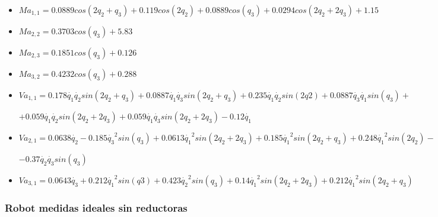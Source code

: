 \begin{itemize}

	\item $ Ma_{1,1}=0.0889cos(2q_{2} + q_{3}) + 0.119cos(2q_{2}) + 0.0889cos(q_{3}) + 0.0294cos(2q_{2} + 2q_{3}) + 1.15$ \\ \vspace{0.2cm}

	\item $ Ma_{2,2}=0.3703cos(q_{3}) + 5.83$ \\ \vspace{0.2cm}

	\item $ Ma_{2,3}=0.1851cos(q_{3}) + 0.126  $ \\ \vspace{0.2cm}

	\item $ Ma_{3,2}=0.4232cos(q_{3}) + 0.288  $ \\ \vspace{0.2cm}

	\item $ Va_{1,1}=0.178\dot{q_1}\dot{q_2}sin(2q_2 + q_3) + 0.0887\dot{q_1}\dot{q_3}sin(2q_2 + q_3) + 0.235\dot{q_1}\dot{q_2}sin(2q2) + 0.0887\dot{q_3}\dot{q_1}sin(q_3) + $ \\ \vspace{0.1cm}

	$+0.059\dot{q_1}\dot{q_2}sin(2q_2 + 2q_3) + 0.059\dot{q_1}\dot{q_3}sin(2q_2 + 2q_3) - 0.12\dot{q_1} $ \\ \vspace{0.2cm}

	\item $ Va_{2,1}=0.0638\dot{q_2} - 0.185\dot{q_3}^{2}sin(q_3) + 0.0613\dot{q_1}^{2}sin(2q_2 + 2q_3) + 0.185\dot{q_1}^{2}sin(2q_2 + q_3) + 0.248\dot{q_1}^{2}sin(2q_2) - $ \\ \vspace{0.1cm}

	$ -0.37\dot{q_2}\dot{q_3}sin(q_3) $\\ \vspace{0.2cm}

	\item $ Va_{3,1}= 0.0643\dot{q_3} + 0.212\dot{q_1}^{2}sin(q3) + 0.423\dot{q_2}^{2}sin(q_3) + 0.14\dot{q_1}^{2}sin(2q_2 + 2q_3) + 0.212\dot{q_1}^{2}sin(2q_2 + q_3) $

\end{itemize}


\subsubsection{Robot medidas ideales sin reductoras}

